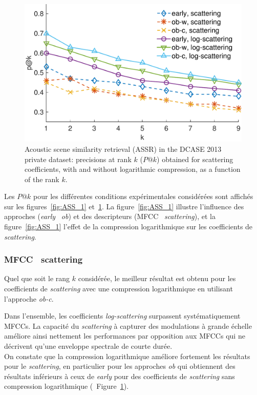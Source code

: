 \begin{figure}[t]
\begin{center}
\includegraphics[width=.9\columnwidth]{gfx/ch_8/unsupervised_test1-eps-converted-to}
\caption{Acoustic scene similarity retrieval (ASSR) in the DCASE 2013 private dataset: precisions at rank $k$ ($P@k$) obtained for scattering coefficients, with and without logarithmic compression, as a function of the rank $k$.}
\label{fig:ASS_2}
\end{center}
\end{figure}

Les $P@k$ pour les différentes conditions expérimentales considérées sont affichés sur les figures~\ref{fig:ASS_1} et~\ref{fig:ASS_2}.  La figure~\ref{fig:ASS_1} illustre l'influence des approches (\emph{early} \vs~\emph{ob}) et des descripteurs  (MFCC \vs~\emph{scattering}), et la figure~\ref{fig:ASS_1} l'effet de la compression logarithmique sur les coefficients de \emph{scattering}.

\subsubsection{MFCC \vs~scattering}


Quel que soit le rang $k$ considérée, le meilleur résultat est obtenu pour les coefficients de \emph{scattering} avec une compression logarithmique en utilisant l'approche \emph{ob-c}. 

Dans l'ensemble, les coefficients \emph{log-scattering} surpassent systématiquement MFCCs. La capacité du \emph{scattering} à capturer des modulations à grande échelle améliore ainsi nettement les performances par opposition aux MFCCs qui ne décrivent qu'une enveloppe spectrale de courte durée.\\

On constate que la compression logarithmique améliore fortement les résultats pour le \emph{scattering}, en particulier pour les approches \emph{ob} qui obtiennent des résultats inférieurs à ceux de \emph{early} pour des coefficients de \emph{scattering} sans compression logarithmique (\cf~Figure~\ref{fig:ASS_2}).

